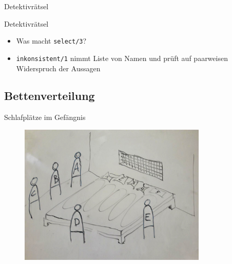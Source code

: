 \documentclass{beamer}
\newcommand{\code}[1]{
	\begin{mdframed}
		
	\end{mdframed}
}
\begin{document}
\begin{frame}{Detektivrätsel}
	\code{demos/detektiv.pl}
\end{frame}

\begin{frame}{Detektivrätsel}
	\code{demos/detektiv2.pl}
	
	\begin{itemize}
		\item Was macht \texttt{select/3}?
		\item \texttt{inkonsistent/1} nimmt Liste von Namen und prüft auf paarweisen Widerspruch der Aussagen
	\end{itemize}
\end{frame}


\subsection{Bettenverteilung}

\begin{frame}{Schlafplätze im Gefängnis}
	\begin{figure}
		\includegraphics[width=0.8\textwidth]{images/bett}
	\end{figure}
\end{frame}
\end{document}
